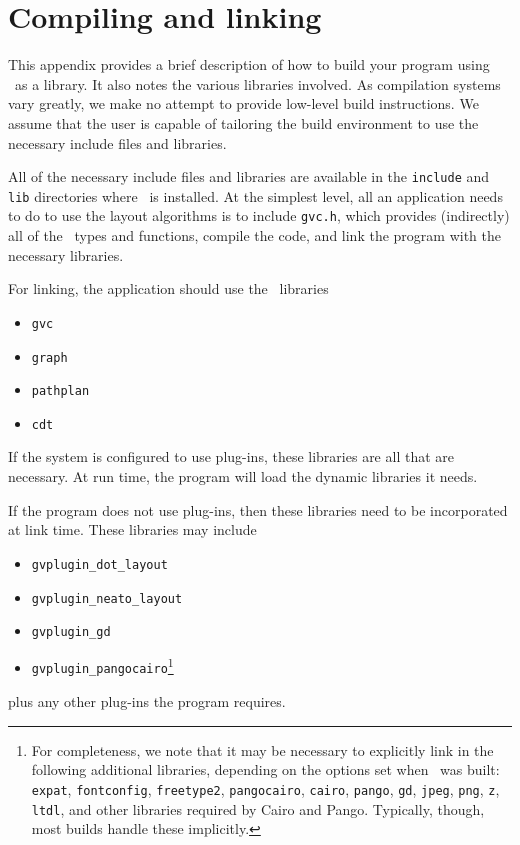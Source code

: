 \section{Compiling and linking}
\label{sec:build}
This appendix provides a brief description of how to build
your program using \gviz\ as a library. It also notes the 
various libraries involved. As compilation systems vary
greatly, we make no attempt to provide low-level build
instructions. We assume that the user is capable of tailoring
the build environment to use the necessary include files and
libraries.

All of the necessary include files and libraries are available
in the {\tt include} and {\tt lib} directories where \gviz\
is installed. At the simplest level, all an application needs
to do to use the layout algorithms is to include {\tt gvc.h},
which provides (indirectly) all of the \gviz\ types and functions,
compile the code,
and link the program with the necessary libraries.

For linking, the application should use the \gviz\ libraries 
\begin{itemize}
\item {\tt gvc}
\item {\tt graph}
\item {\tt pathplan}
\item {\tt cdt}
\end{itemize}
If the system is configured to use plug-ins, these libraries
are all that are necessary. At run time, the program will
load the dynamic libraries it needs.

If the program does not use plug-ins, then these libraries
need to be incorporated at link time. These libraries may
include
\begin{itemize}
\item {\tt gvplugin\_dot\_layout}
\item {\tt gvplugin\_neato\_layout}
\item {\tt gvplugin\_gd}
\item {\tt gvplugin\_pangocairo}\footnote{
For completeness, we note that it may be necessary to explicitly
link in the following additional libraries, depending
on the options set when \gviz\ was built:
{\tt expat},
{\tt fontconfig},
{\tt freetype2},
{\tt pangocairo},
{\tt cairo},
{\tt pango},
{\tt gd},
{\tt jpeg},
{\tt png},
{\tt z}, 
{\tt ltdl},
and other libraries required by Cairo and Pango.
Typically, though, most builds handle these implicitly.}
\end{itemize}
plus any other plug-ins the program requires.

